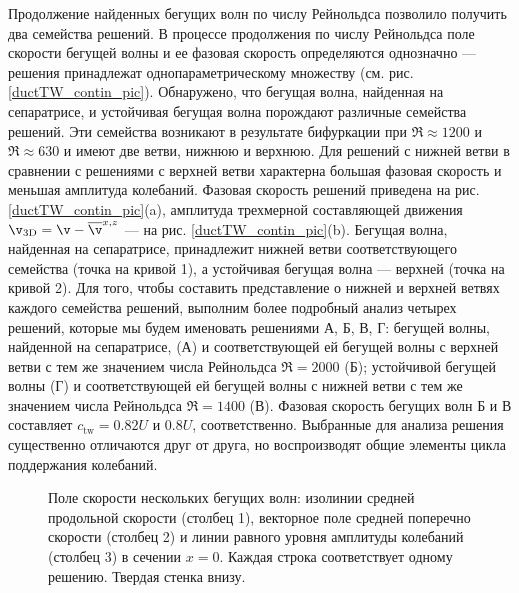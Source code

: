 Продолжение найденных бегущих волн по числу Рейнольдса позволило получить два семейства решений. В процессе продолжения по числу Рейнольдса поле скорости бегущей волны и ее фазовая скорость определяются однозначно --- решения принадлежат однопараметрическому множеству (см. рис. \ref{ductTW_contin_pic}). Обнаружено, что бегущая волна, найденная на сепаратрисе, и устойчивая бегущая волна порождают различные семейства решений. Эти семейства возникают в результате бифуркации при $\Re \approx 1200$ и $\Re \approx 630$ и имеют две ветви, нижнюю и верхнюю. Для решений с нижней ветви в сравнении с решениями с верхней ветви характерна большая фазовая скорость и меньшая амплитуда колебаний. Фазовая скорость решений приведена на рис. \ref{ductTW_contin_pic}(a), амплитуда трехмерной составляющей движения $\v_\mathrm{3D} = \v - \overline{\v}^{x,z}$ ---  на рис. \ref{ductTW_contin_pic}(b). Бегущая волна, найденная на сепаратрисе, принадлежит нижней ветви соответствующего семейства (точка на кривой 1), а устойчивая бегущая волна --- верхней (точка на кривой 2). Для того, чтобы составить представление о нижней и верхней ветвях каждого семейства решений, выполним более подробный анализ четырех решений, которые мы будем именовать решениями А, Б, В, Г: бегущей волны, найденной на сепаратрисе, (А) и соответствующей ей бегущей волны с верхней ветви с тем же значением числа Рейнольдса $\Re = 2000$ (Б); устойчивой бегущей волны (Г) и соответствующей ей бегущей волны с нижней ветви с тем же значением числа Рейнольдса $\Re = 1400$ (В). Фазовая скорость бегущих волн Б и В составляет $c_\mathrm{tw} = 0.82U$ и $0.8U$, соответственно. Выбранные для анализа решения существенно отличаются друг от друга, но воспроизводят общие элементы цикла поддержания колебаний. 

\begin{figure}
\caption{Поле скорости нескольких бегущих волн: изолинии средней продольной скорости (столбец 1), векторное поле средней поперечно скорости (столбец 2) и линии равного уровня амплитуды колебаний (столбец 3) в сечении $x = 0$. Каждая строка соответствует одному решению. Твердая стенка внизу.} 
\label{ductTW_means_pic}
\end{figure}

